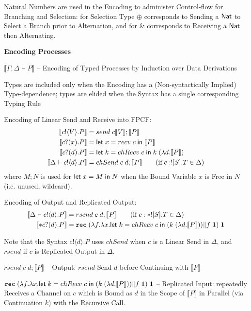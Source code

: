 \fist Natural Numbers are used in the Encoding to administer
Control-flow for Branching and Selection: for Selection Type $\oplus$
corresponds to Sending a $\mathsf{Nat}$ to Select a Branch prior to
Alternation, and for $\&$ corresponds to Receiving a $\mathsf{Nat}$ then
Alternating.


\textbf{Encoding Processes}

$\llbracket\Gamma;\Delta \vdash P\rrbracket$ -- Encoding of Typed
Processes by Induction over Data Derivations

\fist Types are included only when the Encoding has a
(Non-syntactically Implied) Type-dependence; types are elided when the
Syntax has a single corresponding Typing Rule

Encoding of Linear Send and Receive into FPCF:
\begin{align*}
  \llbracket{c!\langle{V}\rangle.P}\rrbracket
    & = send\;c \llbracket{V}\rrbracket ; \llbracket{P}\rrbracket \\
  \llbracket{c?(x).P}\rrbracket
    & = \mathsf{let}\; x = recv\;c \;\mathsf{in}\; \llbracket{P}\rrbracket \\
  \llbracket{c?(d).P}\rrbracket
    & = \mathsf{let}\; k = chRecv\; c \;\mathsf{in}\;
      k\;(\lambda d.\llbracket{P}\rrbracket) \\
  \llbracket{\Delta \vdash c!\langle{d}\rangle.P}\rrbracket
    & = chSend\;c\;d ; \llbracket{P}\rrbracket
      \quad\quad (\text{if}\;c : ![S].T \in \Delta)
\end{align*}
where $M ; N$ is used for $\mathsf{let}\;x = M \;\mathsf{in}\; N$ when the Bound
Variable $x$ is Free in $N$ (i.e. unused, wildcard).

Encoding of Output and Replicated Output:
\begin{align*}
  \llbracket{\Delta \vdash c!\langle{d}\rangle.P}\rrbracket
    & = rsend\;c\;d ; \llbracket{P}\rrbracket \quad\quad
      (\text{if}\;c : *![S].T \in \Delta) \\
  \llbracket{*c?(d).P}\rrbracket
    & = \mathtt{rec}\;(\lambda f.\lambda x.\mathsf{let}\;k = chRecv\;c \;\mathsf{in}\;
      (k\;(\lambda d.\llbracket{P}\rrbracket)) \| f\;\mathbf{1})\;\mathbf{1}
\end{align*}

\fist Note that the Syntax $c!\langle{d}\rangle.P$ uses $chSend$ when
$c$ is a Linear Send in $\Delta$, and $rsend$ if $c$ is Replicated
Output in $\Delta$.

$rsend\;c\;d ; \llbracket{P}\rrbracket$ -- Output: $rsend$ Send $d$
before Continuing with $\llbracket{P}\rrbracket$

$\mathtt{rec}\;(\lambda f.\lambda x.\mathsf{let}\;k = chRecv\;c \;\mathsf{in}\; (k\;(\lambda
d.\llbracket{P}\rrbracket)) \| f\;\mathbf{1})\;\mathbf{1}$ -- Replicated Input:
repeatedly Receives a Channel on $c$ which is Bound as $d$ in the
Scope of $\llbracket{P}\rrbracket$ in Parallel (via Continuation $k$)
with the Recursive Call.

